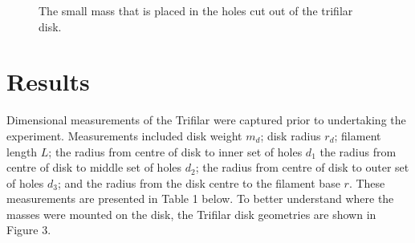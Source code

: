 \documentclass[a4paper]{article}
\begin{document}
\begin{figure}[h]
\begin{minipage}{0.45\textwidth}
	\end{minipage}
	\hspace{1cm}
	\begin{minipage}{0.45\textwidth}
		\centering
		\caption{The small mass that is placed in the holes cut out of the trifilar disk.}
	\end{minipage}
\end{figure}

\section{Results}
Dimensional measurements of the Trifilar were captured prior to undertaking the experiment. Measurements included disk weight $m_d$; disk radius $r_d$; filament length $L$; the radius from centre of disk to inner set of holes $d_1$ the radius from centre of disk to middle set of holes $d_2$; the radius from centre of disk to outer set of holes $d_3$; and the radius from the disk centre to the filament base $r$. These measurements are presented in Table 1 below. To better understand where the masses were mounted on the disk, the Trifilar disk geometries are shown in Figure 3.
\end{document}
